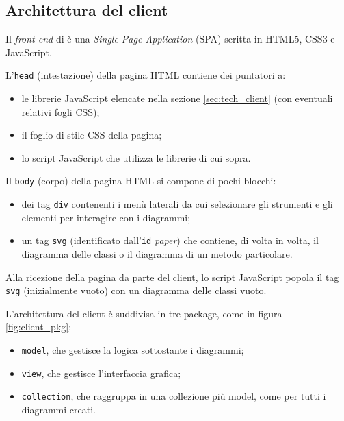 \subsection{Architettura del client} \label{sec:arch_client}
Il \emph{front end} di \proj{} è una \emph{Single Page Application} (SPA) scritta in HTML5, CSS3 e JavaScript.

L'\texttt{head} (intestazione) della pagina HTML contiene dei puntatori a:
\begin{itemize}
	\item le librerie JavaScript elencate nella sezione \ref{sec:tech_client} (con eventuali relativi fogli CSS);
	\item il foglio di stile CSS della pagina;
	\item lo script JavaScript che utilizza le librerie di cui sopra.
\end{itemize}

Il \texttt{body} (corpo) della pagina HTML si compone di pochi blocchi:
\begin{itemize}
	\item dei tag \texttt{div} contenenti i menù laterali da cui selezionare gli strumenti e gli elementi per interagire con i diagrammi;
	\item un tag \texttt{svg} (identificato dall'\texttt{id} \emph{paper}) che contiene, di volta in volta, il diagramma delle classi o il diagramma di un metodo particolare.
\end{itemize}
Alla ricezione della pagina da parte del client, lo script JavaScript popola il tag \texttt{svg} (inizialmente vuoto) con un diagramma delle classi vuoto.

L'architettura del client è suddivisa in tre package, come in figura \ref{fig:client_pkg}:
\begin{itemize}
	\item \texttt{model}, che gestisce la logica sottostante i diagrammi;
	\item \texttt{view}, che gestisce l'interfaccia grafica;
	\item \texttt{collection}, che raggruppa in una collezione più model, come per tutti i diagrammi creati.
\end{itemize}

